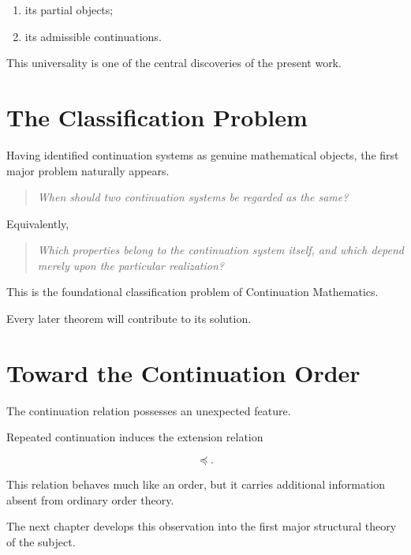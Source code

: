 \documentclass[13pt,openany]{book}
\theoremstyle{plain}
\theoremstyle{definition}
\begin{document}
\begin{enumerate}
\item its partial objects;
\item its admissible continuations.
\end{enumerate}

This universality is one of the central discoveries of the present work.

\section{The Classification Problem}

Having identified continuation systems as genuine mathematical objects,
the first major problem naturally appears.

\begin{quote}
\emph{When should two continuation systems be regarded as the same?}
\end{quote}

Equivalently,

\begin{quote}
\emph{Which properties belong to the continuation system itself, and which
depend merely upon the particular realization?}
\end{quote}

This is the foundational classification problem of Continuation
Mathematics.

Every later theorem will contribute to its solution.

\section{Toward the Continuation Order}

The continuation relation possesses an unexpected feature.

Repeated continuation induces the extension relation

\[
\preceq.
\]

This relation behaves much like an order, but it carries additional
information absent from ordinary order theory.

The next chapter develops this observation into the first major structural
theory of the subject.
\end{document}
